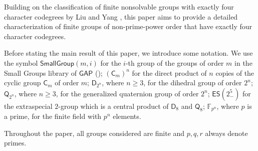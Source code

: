 \documentclass[9pt]{article}
\begin{document}
Building on the classification of finite nonsolvable groups with exactly four character codegrees by Liu and Yang \cite{liu2021}, this paper aims to provide a detailed characterization of finite groups of non-prime-power order that have exactly four character codegrees.



Before stating the main result of this paper, we introduce some notation.
We use the symbol $\mathsf{SmallGroup}(m,i)$ for the $i$-th group of 
the groups of order $m$ in the Small Groups library of $\mathsf{GAP}$ (\cite{gap});
$(\mathsf{C}_{m})^{n}$ for the direct product of $n$ copies of the cyclic group  $\mathsf{C}_{m}$ of order $m$;
$\mathsf{D}_{2^{n}}$, where $n\geq 3$, for the dihedral group of order $2^{n}$;
$\mathsf{Q}_{2^{n}}$, where $n\geq 3$, for the generalized quaternion group of order $2^{n}$;
$\mathsf{ES}(2^{5}_-)$ for the extraspecial $2$-group 
which is a central product of $\mathsf{D}_8$ and 
$\mathsf{Q}_8$;
$\mathbb{F}_{p^n}$, where $p$ is a prime, for the finite field with $p^{n}$ elements.

Throughout the paper, all groups considered are finite and $p,q,r$ always denote primes.
\end{document}
